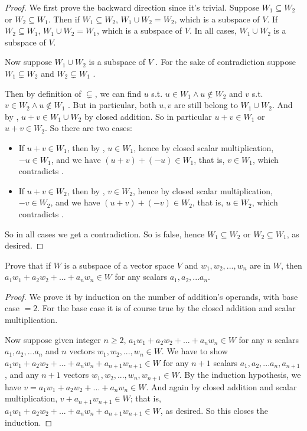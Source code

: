 \begin{proof}
We first prove the backward direction since it's trivial.
Suppose \(W_1 \subseteq W_2\) or \(W_2 \subseteq W_1\).
Then if \(W_1 \subseteq W_2\), \(W_1 \cup W_2 = W_2\), which is a subspace of \(V\).
If \(W_2 \subseteq W_1\), \(W_1 \cup W_2 = W_1\), which is a subspace of \(V\).
In all cases, \(W_1 \cup W_2\) is a subspace of \(V\).

Now suppose \(W_1 \cup W_2\) is a subspace of \(V\) .
For the sake of contradiction suppose \(W_1 \subsetneq W_2\) and \(W_2 \subsetneq W_1\) .

Then by definition of \(\subsetneq\), we can find \(u\) s.t. \(u \in W_1 \land u \not \in W_2\)  and \(v\) s.t. \(v \in W_2 \land u \not \in W_1\) .
But in particular, both \(u, v\) are still belong to \(W_1 \cup W_2\).
And by , \(u + v \in W_1 \cup W_2\) by closed addition.
So in particular \(u + v \in W_1\) or \(u + v \in W_2\).
So there are two cases:
\begin{itemize}
    \item If \(u + v \in W_1\), then by , \(u \in W_1\), hence by closed scalar multiplication, \(-u \in W_1\), and we have \((u + v) + (-u) \in W_1\), that is, \(v \in W_1\), which contradicts .
    \item If \(u + v \in W_2\), then by , \(v \in W_2\), hence by closed scalar multiplication, \(-v \in W_2\), and we have \((u + v) + (-v) \in W_2\), that is, \(u \in W_2\), which contradicts .
\end{itemize}
So in all cases we get a contradiction.
So  is false, hence \(W_1 \subseteq W_2\) or \(W_2 \subseteq W_1\), as desired.
\end{proof}

\begin{exercise} \label{exercise 1.3.20}
Prove that if \(W\) is a subspace of a vector space \(V\) and \(w_1, w_2, ..., w_n\) are in \(W\), then \(a_1 w_1 + a_2 w_2 + ... + a_n w_n \in W\) for any scalars \(a_1, a_2, ... a_n\).
\end{exercise}

\begin{proof}
We prove it by induction on the number of addition's operands, with base case \(= 2\).
For the base case it is of course true by the closed addition and scalar multiplication.

Now suppose given integer \(n \ge 2\), \(a_1 w_1 + a_2 w_2 + ... + a_n w_n \in W\) for any \(n\) scalars \(a_1, a_2, ... a_n\) and \(n\) vectors \(w_1, w_2, ..., w_n \in W\).
We have to show \(a_1 w_1 + a_2 w_2 + ... + a_n w_n + a_{n + 1} w_{n + 1} \in W\) for any \(n + 1\) scalars \(a_1, a_2, ... a_n, a_{n + 1}\),
and any \(n + 1\) vectors \(w_1, w_2, ..., w_n, w_{n + 1} \in W\).
By the induction hypothesis, we have \(v = a_1 w_1 + a_2 w_2 + ... + a_n w_n \in W\).
And again by closed addition and scalar multiplication, \(v + a_{n + 1} w_{n + 1} \in W\);
that is, \(a_1 w_1 + a_2 w_2 + ... + a_n w_n + a_{n + 1} w_{n + 1} \in W\), as desired.
So this closes the induction.
\end{proof}

